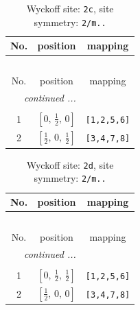 \documentclass[fleqn,8pt]{jsarticle}
\begin{document}
\renewcommand{\arraystretch}{1.2}
\begin{longtable}{ccc}
\caption{Wyckoff site: {\tt 2c}, site symmetry: {\tt 2/m..}}
 \\
 \hline \hline
No. & position & mapping \\ \hline \endfirsthead

\multicolumn{2}{l}{\tablename\ \thetable{}} \\
 \hline \hline
No. & position & mapping \\ \hline \endhead

 \hline \hline
\multicolumn{2}{r}{\footnotesize\it continued ...} \\ \endfoot

 \hline \hline
\multicolumn{2}{r}{} \\ \endlastfoot

1 & $\left[ 0,\, \frac{1}{2},\, 0 \right]$ & {\tt [1,2,5,6]} \\ \hline
2 & $\left[ \frac{1}{2},\, 0,\, \frac{1}{2} \right]$ & {\tt [3,4,7,8]} \\
\end{longtable}
\renewcommand{\arraystretch}{1.2}
\begin{longtable}{ccc}
\caption{Wyckoff site: {\tt 2d}, site symmetry: {\tt 2/m..}}
 \\
 \hline \hline
No. & position & mapping \\ \hline \endfirsthead

\multicolumn{2}{l}{\tablename\ \thetable{}} \\
 \hline \hline
No. & position & mapping \\ \hline \endhead

 \hline \hline
\multicolumn{2}{r}{\footnotesize\it continued ...} \\ \endfoot

 \hline \hline
\multicolumn{2}{r}{} \\ \endlastfoot

1 & $\left[ 0,\, \frac{1}{2},\, \frac{1}{2} \right]$ & {\tt [1,2,5,6]} \\ \hline
2 & $\left[ \frac{1}{2},\, 0,\, 0 \right]$ & {\tt [3,4,7,8]} \\
\end{longtable}
\renewcommand{\arraystretch}{1.2}
\end{document}
